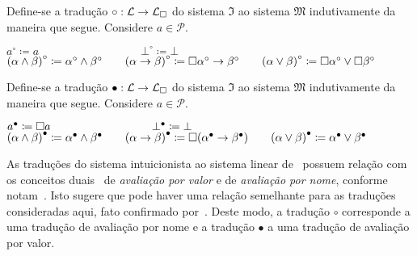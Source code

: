     \vspace{0.5\baselineskip}
    \begin{tcolorbox}[enhanced jigsaw, breakable, sharp corners, colframe=black, colback=white, boxrule=0.5pt, left=1.5mm, right=1.5mm, top=1.5mm, bottom=1.5mm]
    \begin{definition}\label{translation.circle}
        Define-se a tradução $\circ:\mathcal{L}\to\mathcal{L}_{\Box}$ do sistema $\mathfrak{I}$ ao sistema $\mathfrak{M}$ indutivamente da maneira que segue.
        Considere $a\in\mathcal{P}$.

        \begin{center}
            $a^\circ\coloneqq a\quad\quad\quad\quad\quad\quad\quad\quad\quad\bot^\circ\coloneqq\bot$\\\vspace{0.5\baselineskip}
            ${(\alpha\wedge\beta)}^\circ\coloneqq\alpha^\circ\wedge\beta^\circ\quad\quad{(\alpha \to \beta)}^\circ\coloneqq \Box \alpha^\circ \to \beta^\circ\quad\quad{(\alpha\vee\beta)}^\circ\coloneqq\Box\alpha^\circ\vee\Box\beta^\circ$
        \end{center}
    \end{definition}
    \end{tcolorbox}

    \begin{tcolorbox}[enhanced jigsaw, breakable, sharp corners, colframe=black, colback=white, boxrule=0.5pt, left=1.5mm, right=1.5mm, top=1.5mm, bottom=1.5mm]
    \begin{definition}\label{translation.square}
        Define-se a tradução $\bullet:\mathcal{L}\to\mathcal{L}_{\Box}$ do sistema $\mathfrak{I}$ ao sistema $\mathfrak{M}$ indutivamente da maneira que segue.
        Considere $a\in\mathcal{P}$.

        \begin{center}
            $a^\bullet\coloneqq\Box a\quad\quad\quad\quad\quad\quad\quad\quad\quad\bot^\bullet\coloneqq\bot$\\\vspace{0.5\baselineskip}
            ${(\alpha\wedge\beta)}^\bullet\coloneqq\alpha^\bullet\wedge\beta^\bullet\quad\quad{(\alpha \to \beta)}^\bullet\coloneqq \Box (\alpha^\bullet \to \beta^\bullet)\quad\quad{(\alpha\vee\beta)}^\bullet\coloneqq\alpha^\bullet\vee\beta^\bullet$
        \end{center}
    \end{definition}
    \end{tcolorbox}

    \vspace{0.5\baselineskip}
    As traduções do sistema intuicionista ao sistema linear de~\cite{Girard.1987} possuem relação com os conceitos duais~\citep{Wadler.2003} de \emph{avaliação por valor} e de \emph{avaliação por nome}, conforme notam~\cite{Maraist+others.1999}.
    Isto sugere que pode haver uma relação semelhante para as traduções consideradas aqui, fato confirmado por~\cite{Espírito-Santo+others.2019}.
    Deste modo, a tradução $\circ$ corresponde a uma tradução de avaliação por nome e a tradução $\bullet$ a uma tradução de avaliação por valor.
